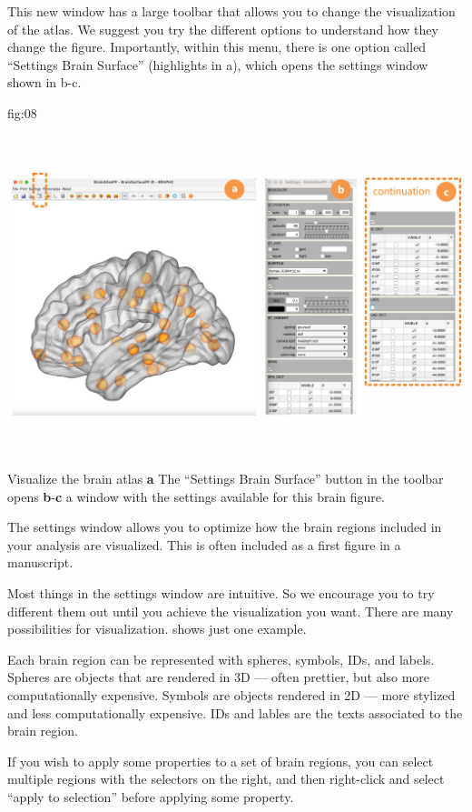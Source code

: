 \documentclass[justified]{tufte-handout}
\begin{document}
This new window has a large toolbar that allows you to change the visualization of the atlas. We suggest you try the different options to understand how they change the figure. Importantly, within this menu, there is one option called ``Settings Brain Surface'' (highlights in a), which opens the settings window shown in b-c.

	{fig:08}
	{\includegraphics[height=10cm]{fig08.png}}
	{Visualize the brain atlas}
	{
	{\bf a} The ``Settings Brain Surface'' button in the toolbar opens {\bf b}-{\bf c} a window with the settings available for this brain figure.
	}

The settings window allows you to optimize how the brain regions included in your analysis are visualized. This is often included as a first figure in a manuscript.

Most things in the settings window are intuitive. So we encourage you to try different them out until you achieve the visualization you want. There are many possibilities for visualization.  shows just one example.

Each brain region can be represented with spheres, symbols, IDs, and labels.
Spheres are objects that are rendered in 3D --- often prettier, but also more computationally expensive.
Symbols are objects rendered in 2D --- more stylized and less computationally expensive.
IDs and lables are the texts associated to the brain region.

If you wish to apply some properties to a set of brain regions, you can select multiple regions with the selectors on the right, and then right-click and select ``apply to selection'' before applying some property.
\end{document}
